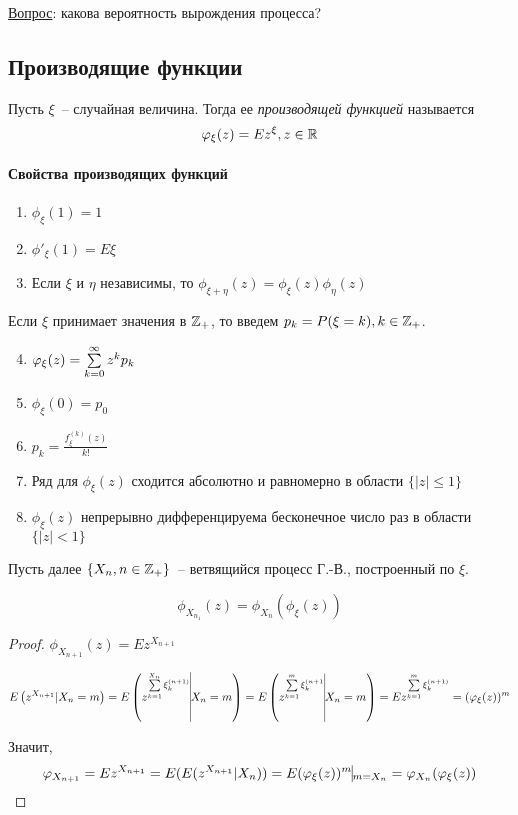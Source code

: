 \underline{Вопрос}: какова вероятность вырождения процесса?

\subsection{Производящие функции}
\begin{definition}
Пусть $\xi$~-- случайная величина. Тогда ее \emph{производящей функцией} называется
$$\varphi_\xi(z) = Ez^\xi, z \in \mathbb{R}$$
\end{definition}

\paragraph{Свойства производящих функций}

\begin{enumerate}
\item $\phi_\xi(1) = 1$
\item $\phi'_\xi(1) = E\xi$
\item Если $\xi$ и $\eta$ независимы, то $\phi_{\xi + \eta}(z) = \phi_\xi(z) \phi_\eta(z)$
\end{enumerate}

Если $\xi$ принимает значения в $\mathbb{Z}_+$, то введем $p_k = P(\xi = k), k \in \mathbb{Z}_+$.

\begin{enumerate}
\setcounter{enumi}{3}
\item $\varphi_\xi(z) = \sum\limits_{k=0}^{\infty}z^k p_k$
\item $\phi_\xi(0) = p_0$
\item $p_k = \frac{f_\xi^{(k)}(z)}{k!}$
\item Ряд для $\phi_\xi(z)$ сходится абсолютно и равномерно в области $\{|z| \leq 1\}$
\item $\phi_\xi(z)$ непрерывно дифференцируема бесконечное число раз в области $\{|z| < 1\}$
\end{enumerate}

Пусть далее $\{X_n, n \in \mathbb{Z}_+\}$~-- ветвящийся процесс Г.-В., построенный по $\xi$.

\begin{lem} \label{lem:phi_xi_n}
$$\phi_{X_{n_1}}(z) = \phi_{X_n}(\phi_\xi(z))$$
\end{lem}
\begin{proof}
$\phi_{X_{n+1}}(z) = Ez^{X_{n+1}}$

$$
 E \pars {z^{X_{n+1}} | X_n = m} =
 E \pars {z^{\mysum_{k=1}^{X_n} \xi_k^{(n+1)}} \vline X_n = m} =
 E \pars {z^{\mysum_{k=1}^m \xi_k^{(n+1}} \vline X_n = m} =
 E z^{\mysum_{k=1}^m \xi_k^{(n+1)}} =
 (\phi_\xi(z))^m
$$

Значит,
$$\phi_{X_{n+1}} = Ez^{X_{n+1}} = E(E(z^{X_{n+1}}|X_n)) =
E(\phi_\xi(z))^m \vline_{m = X_n} = \phi_{X_n}(\phi_\xi(z))$$
\end{proof}

